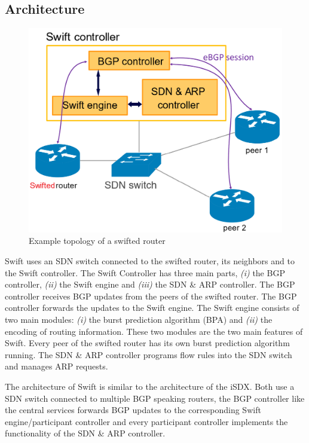 \subsection{\label{chapter2:Swift:Architecture_SWift}Architecture}

\begin{figure}[h]
\center
\includegraphics[scale = 0.3]{Figures/swift_topo_cropped.pdf}
\caption{Example topology of a swifted router \cite{swift}}
\end{figure}

Swift uses an SDN switch connected to the swifted router, its neighbors and to the Swift controller. The Swift Controller has three main parts, \emph{(i)} the BGP controller, \emph{(ii)} the Swift engine and \emph{(iii)} the SDN \& ARP controller. The BGP controller receives BGP updates from the peers of the swifted router. The BGP controller forwards the updates to the Swift engine. The Swift engine consists of two main modules: \emph{(i)} the burst prediction algorithm (BPA) and \emph{(ii)} the encoding of routing information. These two modules are the two main features of Swift. Every peer of the swifted router has its own burst prediction algorithm running. The SDN \& ARP controller programs flow rules into the SDN switch and manages ARP requests. 

The architecture of Swift is similar to the architecture of the iSDX. Both use a SDN switch connected to multiple BGP speaking routers, the BGP controller like the central services forwards BGP updates to the corresponding Swift engine/participant controller and every participant controller implements the functionality of the SDN \& ARP controller. 








